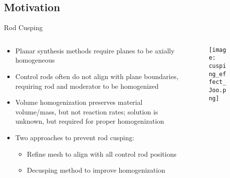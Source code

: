 \subsection{Motivation}
\begin{frame}[t]{Rod Cusping}

\begin{columns}
    \begin{column}{0.6\textwidth}
        \begin{itemize}
            \item Planar synthesis methods require planes to be axially homogeneous
            \item Control rods often do not align with plane boundaries, 
            requiring rod and moderator to be homogenized
            \item Volume homogenization preserves material volume/mass, but not 
            reaction rates; solution is unknown, but required for proper homogenization
            \item Two approaches to prevent rod cusping:
            \vspace{-8pt}
            \begin{itemize}
                \item Refine mesh to align with all control rod positions
                \item Decusping method to improve homogenization
            \end{itemize}
        \end{itemize}
    \end{column}
    \begin{column}{0.4\textwidth}
        \begin{figure}[h]
            \centering
            \texttt{[image: cusping\_effect\_Joo.png]}
        \end{figure} 
    \end{column}
\end{columns}

\end{frame}


